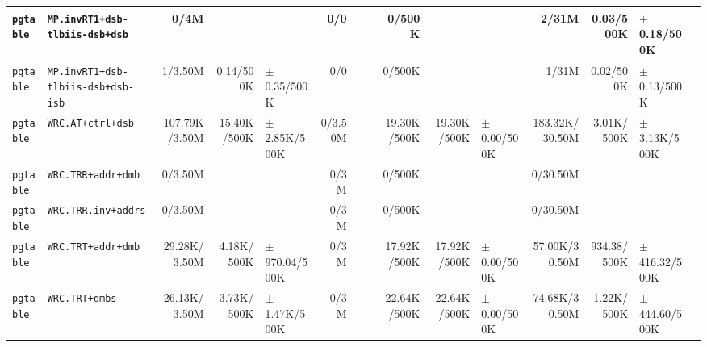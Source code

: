 \begin{tabular}{l l  | r r l | r r l | r r l | r r l l}
     \verb|pgtable| &                        \verb|MP.invRT1+dsb-tlbiis-dsb+dsb| &           0/4M &                       &                   &            0/0 &                       &                 &         0/500K &                       &                   &          2/31M &             0.03/500K &   $\pm$ 0.18/500K & \\ \hline 
     \verb|pgtable| &                    \verb|MP.invRT1+dsb-tlbiis-dsb+dsb-isb| &        1/3.50M &             0.14/500K &   $\pm$ 0.35/500K &            0/0 &                       &                 &         0/500K &                       &                   &          1/31M &             0.02/500K &   $\pm$ 0.13/500K & \\ \hline 
     \verb|pgtable| &                                     \verb|WRC.AT+ctrl+dsb| &  107.79K/3.50M &           15.40K/500K &  $\pm$ 2.85K/500K &        0/3.50M &                       &                 &    19.30K/500K &           19.30K/500K &   $\pm$ 0.00/500K & 183.32K/30.50M &            3.01K/500K &  $\pm$ 3.13K/500K & \\ \hline 
     \verb|pgtable| &                                    \verb|WRC.TRR+addr+dmb| &        0/3.50M &                       &                   &           0/3M &                       &                 &         0/500K &                       &                   &       0/30.50M &                       &                   & \\ \hline 
     \verb|pgtable| &                                   \verb|WRC.TRR.inv+addrs| &        0/3.50M &                       &                   &           0/3M &                       &                 &         0/500K &                       &                   &       0/30.50M &                       &                   & \\ \hline 
     \verb|pgtable| &                                    \verb|WRC.TRT+addr+dmb| &   29.28K/3.50M &            4.18K/500K & $\pm$ 970.04/500K &           0/3M &                       &                 &    17.92K/500K &           17.92K/500K &   $\pm$ 0.00/500K &  57.00K/30.50M &           934.38/500K & $\pm$ 416.32/500K & \\ \hline 
     \verb|pgtable| &                                        \verb|WRC.TRT+dmbs| &   26.13K/3.50M &            3.73K/500K &  $\pm$ 1.47K/500K &           0/3M &                       &                 &    22.64K/500K &           22.64K/500K &   $\pm$ 0.00/500K &  74.68K/30.50M &            1.22K/500K & $\pm$ 444.60/500K & \\ \hline 

\end{tabular}
